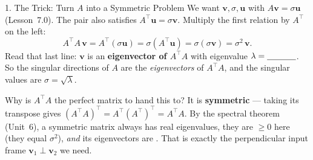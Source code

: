 \documentclass[10pt]{article}
\newcommand{\uu}{\mathbf{u}}
\newcommand{\vv}{\mathbf{v}}
\newcommand{\T}{^{\top}}
\begin{document}
\begin{notesbox}{1. The Trick: Turn $A$ into a Symmetric Problem}
We want $\vv,\sigma,\uu$ with $A\vv=\sigma\uu$ (Lesson~7.0). The pair also satisfies $A\T\uu=\sigma\vv$.
Multiply the first relation by $A\T$ on the left:
\[
  A\T A\,\vv = A\T(\sigma\uu) = \sigma(A\T\uu) = \sigma(\sigma\vv) = \sigma^2\,\vv.
\]
Read that last line: $\vv$ is an \textbf{eigenvector of $A\T A$} with eigenvalue
$\lambda=\blank{1.2cm}$. So the singular directions of $A$ are the \emph{eigenvectors} of $A\T A$, and
the singular values are $\sigma=\sqrt{\lambda}$.

\vspace{2pt}
Why is $A\T A$ the perfect matrix to hand this to? It is \textbf{symmetric} --- taking its transpose
gives $(A\T A)\T=A\T (A\T)\T=A\T A$. By the spectral theorem (Unit~6), a symmetric matrix always has
real eigenvalues, they are $\ge0$ here (they equal $\sigma^2$), \emph{and} its eigenvectors are
\blank{2.4cm}. That is exactly the perpendicular input frame $\vv_1\perp\vv_2$ we need.
\end{notesbox}
\end{document}
